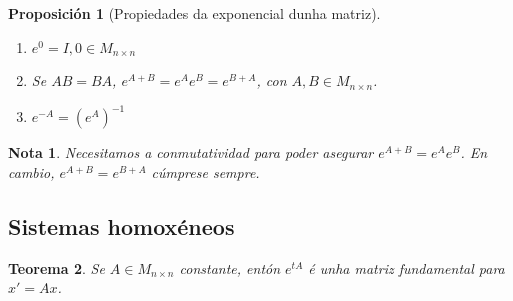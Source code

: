 \documentclass[11pt, a4paper,twoside]{article}
\theoremstyle{theorem-style}  %
\newtheorem{theorem}{Teorema}[section]  %
\newtheorem{proposition}[theorem]{Proposición}
\theoremstyle{definition-style}
\newtheorem*{note}{Nota} %
\theoremstyle{example-style}
\begin{document}
\begin{proposition}[Propiedades da exponencial dunha matriz] \ 
	\begin{enumerate}[\quad i)]
		\item $ e^0 =I, 0 \in M_{n\times n}$
		\item Se $ AB=BA $, $ e^{A+B}=e^Ae^B=e^{B+A} $, con $ A,B\in M_{n\times n} $. 
		\item $ e^{-A}=(e^A)^{-1} $
	\end{enumerate}
\end{proposition}
\begin{note}
	Necesitamos a conmutatividad para poder asegurar  $ e^{A+B}=e^Ae^B$. En cambio, $ e^{A+B}=e^{B+A} $ cúmprese sempre.
\end{note}
\subsection{Sistemas homoxéneos}
\begin{theorem}
	Se $ A\in M_{n\times n} $ constante, entón $ e^{tA} $ é unha matriz fundamental para $ x'=Ax $.
\end{theorem}
\end{document}
